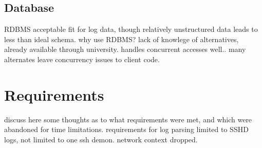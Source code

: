\subsection{Database}
RDBMS acceptable fit for log data, though relatively unstructured data leads to less than ideal schema. why use RDBMS? lack of knowlege of alternatives, already available through university. handles concurrent accesses well.. many alternates leave concurrency issues to client code.


\section{Requirements}
discuss here some thoughts as to what requirements were met, and which were abandoned for time limitations.
requirements for log parsing limited to SSHD logs, not limited to one ssh demon.
network context dropped.



